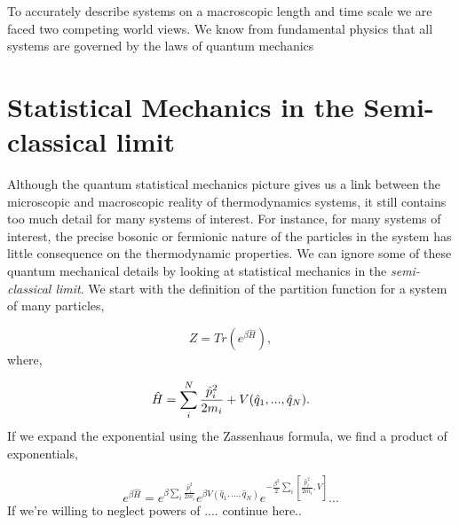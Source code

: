 To accurately describe systems on a macroscopic length and time scale we are faced two competing world views. We know from fundamental physics that all systems are governed by the laws of quantum mechanics


\section{Statistical Mechanics in the Semi-classical limit}

Although the quantum statistical mechanics picture gives us a link between the microscopic and macroscopic reality of thermodynamics systems, it still contains too much detail for many systems of interest. For instance, for many systems of interest, the precise bosonic or fermionic nature of the particles in the system has little consequence on the thermodynamic properties. We can ignore some of these quantum mechanical details by looking at statistical mechanics in the \textit{semi-classical limit}. We start with the definition of the partition function for a system of many particles,  

\begin{equation}
    Z = Tr(e^{\beta \hat{H}}),
\end{equation} 
where, 

\begin{equation}
    \hat{H} = \sum_i^N \frac{\hat{p}_i^2}{2 m_i} + V(\hat{q}_1, ... ,\hat{q}_N).
\end{equation}
If we expand the exponential using the Zassenhaus formula, we find a product of exponentials,

\begin{equation}
    e^{\beta\hat{H}} = e^{\beta \sum_i \frac{\hat{p}_i^2}{2m_i}} 
        e^{\beta V(\hat{q}_1, ..., \hat{q}_N)}
        e^{-\frac{\beta^2}{2}\sum_i\left[\frac{\hat{p}_i^2}{2m_i}, V\right]} ...
\end{equation}
If we're willing to neglect powers of .... continue here..
